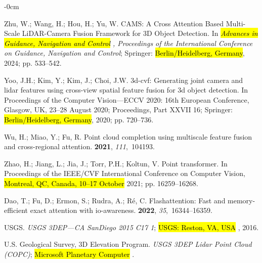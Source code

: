 \documentclass[remotesensing,article,accept,pdftex,moreauthors]{Definitions/mdpi}
\begin{document}
\begin{adjustwidth}{-\extralength}{0cm}
\begin{thebibliography}{999}
Zhu, W.; Wang, H.; Hou, H.; Yu, W.
\newblock CAMS: A Cross Attention Based Multi-Scale LiDAR-Camera Fusion
  Framework for 3D Object Detection.
\newblock In \emph{\hl{Advances in Guidance, Navigation and Control}%
, Proceedings of the International Conference on Guidance,
  Navigation and Control}; Springer: \hl{Berlin/Heidelberg, Germany}, 2024; pp. 533--542.

Yoo, J.H.; Kim, Y.; Kim, J.; Choi, J.W.
\newblock 3d-cvf: Generating joint camera and lidar features using cross-view
  spatial feature fusion for 3d object detection.
\newblock In Proceedings of the Computer Vision---ECCV 2020: 16th European  Conference, Glasgow, UK, 23--28 August 2020; Proceedings, Part XXVII 16; Springer: \hl{Berlin/Heidelberg, Germany}, 2020; pp. 720--736.

Wu, H.; Miao, Y.; Fu, R.
\newblock Point cloud completion using multiscale feature fusion and
  cross-regional attention.
 {\bf 2021}, {\em 111},~104193.

Zhao, H.; Jiang, L.; Jia, J.; Torr, P.H.; Koltun, V.
\newblock Point transformer.
\newblock In Proceedings of the IEEE/CVF International
  Conference on Computer Vision, \hl{Montreal, QC, Canada, 10--17 October} 2021; pp. 16259--16268.

Dao, T.; Fu, D.; Ermon, S.; Rudra, A.; R{\'e}, C.
\newblock Flashattention: Fast and memory-efficient exact attention with
  io-awareness.
 {\bf 2022},
  {\em 35},~16344--16359.

{USGS}.
\newblock \emph{{USGS} 3DEP---{CA} {SanDiego} 2015 C17 1}; \hl{USGS: Reston, VA, USA}%
, 2016.

{U.S. Geological Survey, 3D Elevation Program}.
\newblock \emph{{USGS} 3DEP Lidar Point Cloud ({COPC})};
\newblock \hl{Microsoft Planetary Computer}%
.


\end{thebibliography}
\end{adjustwidth}
\end{document}
